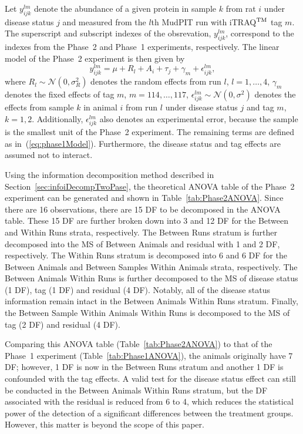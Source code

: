 \documentclass[article]{jss}
\begin{document}
Let $y_{ijk}^{lm}$ denote the abundance of a given protein in sample $k$ from rat $i$ under disease status $j$ and measured from the $l$th MudPIT run with iTRAQ$^{\rm TM}$ tag $m$. The superscript and subscript indexes of the obsrevation, $y_{ijk}^{lm}$, correspond to the indexes from the Phase~2 and Phase~1 experiments, respectively. The linear model of the Phase~2 experiment is then given by
\begin{equation}\label{eq:phase2Model}
y_{ijk}^{lm}= \mu + R_{l} + A_{i}+ \tau_{j} + \gamma_{m} + \epsilon_{ijk}^{lm},
\end{equation}
where $R_{l} \sim \mathcal{N}(0, \sigma_{R}^2)$ denotes the random effects from run $l$,  $l=1,\dots, 4$, $\gamma_{m}$ denotes the fixed effects of tag $m$, $m = 114,\dots, 117$, $\epsilon_{ijk}^{lm} \sim \mathcal{N}(0, \sigma^2)$ denotes the effects from sample $k$ in animal $i$ from run $l$ under disease status $j$ and tag $m$, $k = 1, 2$. Additionally, $\epsilon_{ijk}^{lm}$ also denotes an experimental error, because the sample is the smallest unit of the Phase~2 experiment. The remaining terms are defined as in~(\ref{eq:phase1Model}). Furthermore, the disease status and tag effects are assumed not to interact. 

Using the information decomposition method described in Section~\ref{sec:infoiDecompTwoPase}, the theoretical ANOVA table of the Phase~2 experiment can be generated and shown in Table~\ref{tab:Phase2ANOVA}. Since there are 16 observations, there are 15 DF to be decomposed in the ANOVA table. These 15 DF are further broken down into 3 and 12 DF for the Between and Within Runs strata, respectively. The Between Runs stratum is further decomposed into the MS of Between Animals and residual with 1 and 2 DF, respectively. The Within Runs stratum is decomposed into 6 and 6 DF for the Between Animals and Between Samples Within Animals strata, respectively. The Between Animals Within Runs is further decomposed to the MS of disease status (1 DF), tag (1 DF) and residual (4 DF). Notably, all of the disease status information remain intact in the Between Animals Within Runs stratum. Finally, the Between Sample Within Animals Within Runs is decomposed to the MS of tag (2 DF) and residual (4 DF).

Comparing this ANOVA table (Table~\ref{tab:Phase2ANOVA}) to that of the Phase~1 experiment (Table~\ref{tab:Phase1ANOVA}), the animals originally have 7 DF; however, 1 DF is now in the Between Runs stratum and another 1 DF is confounded with the tag effects. A valid test for the disease status effect can still be conducted in the Between Animals Within Runs stratum, but the DF associated with the residual is reduced from 6 to 4, which reduces the statistical power of the detection of a significant differences between the treatment groups. However, this matter is beyond the scope of this paper. 
\end{document}
